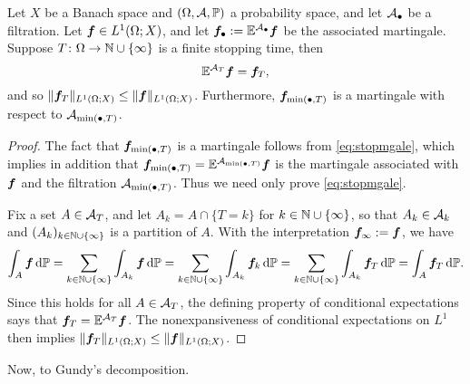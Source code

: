 \begin{prop}
  Let $X$ be a Banach space and $(\Omega,\mathcal{A},\mathbb{P})$ a probability space, and let $\mathcal{A}_{\bullet}$ be a filtration.
  Let $\bm{f} \in L^1(\Omega;X)$, and let $\bm{f}_{\bullet} := \mathbb{E}^{\mathcal{A}_{\bullet}} \bm{f}$ be the associated martingale. 
  Suppose $T \colon \Omega \rightarrow \mathbb{N} \cup \{\infty\}$ is a finite stopping time, then
  \begin{equation}\label{eq:stopmgale}
    \mathbb{E}^{\mathcal{A}_{T}} \bm{f} = \bm{f}_{T},
  \end{equation}
  and so $\|\bm{f}_{T}\|_{L^1(\Omega;X)} \leq \|\bm{f}\|_{L^1(\Omega;X)}$.
  Furthermore, $\bm{f}_{\min(\bullet,T)}$ is a martingale with respect to $\mathcal{A}_{\min(\bullet,T)}$.
\end{prop}

\begin{proof}
  The fact that $\bm{f}_{\min(\bullet,T)}$ is a martingale follows from \eqref{eq:stopmgale}, which implies in addition that $\bm{f}_{\min(\bullet,T)} = \mathbb{E}^{\mathcal{A}_{\min(\bullet,T)}} \bm{f}$ is the martingale associated with $\bm{f}$ and the filtration $\mathcal{A}_{\min(\bullet,T)}$.
  Thus we need only prove \eqref{eq:stopmgale}.
  
  Fix a set $A \in \mathcal{A}_{T}$, and let $A_{k} = A \cap \{T = k\}$ for $k \in \mathbb{N} \cup \{\infty\}$, so that $A_{k} \in \mathcal{A}_{k}$ and $(A_{k})_{k \in \mathbb{N} \cup \{\infty\}}$ is a partition of $A$.
  With the interpretation $\bm{f}_{\infty} := \bm{f}$, we have
  \begin{equation*}
      \int_{A} \bm{f} \, \mathrm{d} \mathbb{P} 
      = \sum_{k \in \mathbb{N} \cup \{\infty\}} \int_{A_k} \bm{f} \, \mathrm{d} \mathbb{P} 
      = \sum_{k \in \mathbb{N} \cup \{\infty\}} \int_{A_{k}} \bm{f}_{k} \, \mathrm{d} \mathbb{P} 
      = \sum_{k \in \mathbb{N} \cup \{\infty\}} \int_{A_{k}} \bm{f}_{T} \, \mathrm{d} \mathbb{P} 
      = \int_{A} \bm{f}_{T} \, \mathrm{d} \mathbb{P}.
  \end{equation*}
  Since this holds for all $A \in \mathcal{A}_{T}$, the defining property of conditional expectations says that $\bm{f}_{T} = \mathbb{E}^{\mathcal{A}_{T}} \bm{f}$.
  The nonexpansiveness of conditional expectations on $L^1$ then implies $\|\bm{f}_{T}\|_{L^1(\Omega;X)} \leq \|\bm{f}\|_{L^1(\Omega;X)}$.
\end{proof}

Now, to Gundy's decomposition.

